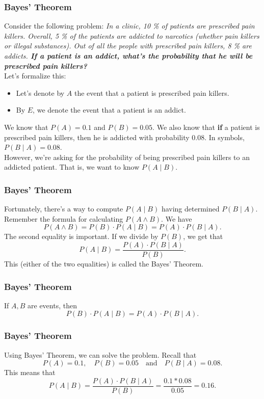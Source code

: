 \documentclass[aspectratio=169,11pt,usenames,dvipsnames]{beamer}
\begin{document}
\begin{frame}
 \frametitle{Bayes' Theorem}
 Consider the following problem:
 \emph{In a clinic, 10 \% of patients are prescribed pain killers. Overall, 5 \%
  of the patients are addicted to narcotics (whether pain killers or illegal
  substances). Out of all the people with prescribed pain killers, 8 \% are
  addicts. \textbf{If a patient is an addict, what's the probability that he
  will be prescribed pain killers?}}\\
  \pause
  Let's formalize this:
  \begin{itemize}
   \item Let's denote by $A$ the event that a patient is prescribed pain
    killers.
   \pause
   \item By $E$, we denote the event that a patient is an addict.
  \end{itemize}
  We know that $P(A) = 0.1$ and $P(B) = 0.05$. \pause
  We also know that \textbf{if} a patient is prescribed pain killers, then he is
  addicted with probability 0.08. In symbols, $P(B \mid A) = 0.08$.\\\pause
  However, we're asking for the probability of being prescribed pain killers to
  an addicted patient. That is, we want to know $P(A \mid B)$.
\end{frame}
\begin{frame}
 \frametitle{Bayes' Theorem}
 Fortunately, there's a way to compute $P(A \mid B)$ having determined $P(B \mid
 A)$.\\
 \pause
 Remember the formula for calculating $P(A \wedge B)$. We have
 \[
  P(A \wedge B) = P(B) \cdot P(A \mid B) = P(A) \cdot P(B \mid A).
 \]
 \pause
 The second equality is important. If we divide by $P(B)$, we get that
 \[
  P(A \mid B) = \frac{P(A) \cdot P(B \mid A)}{P(B)}.
 \]
 \pause
 This (either of the two equalities) is called the \alert{Bayes' Theorem}.
\end{frame}
\begin{frame}
 \frametitle{Bayes' Theorem}
 \begin{tcolorbox}[title=Bayes' Theorem]
  If $A,B$ are events, then
  \[
  P(B) \cdot P(A \mid B) = P(A) \cdot P(B \mid A).
  \]
 \end{tcolorbox}
\end{frame}
\begin{frame}
 \frametitle{Bayes' Theorem}
 Using Bayes' Theorem, we can solve the problem. Recall that
 \[
  P(A) = 0.1, \quad P(B) = 0.05 \quad \text{and} \quad P(B \mid A) = 0.08.
 \]
 \pause
 This means that
 \[
  P(A \mid B) = \frac{P(A) \cdot P(B \mid A)}{P(B)} = \frac{0.1 * 0.08}{0.05} =
  0.16.
 \]
\end{frame}
\end{document}
